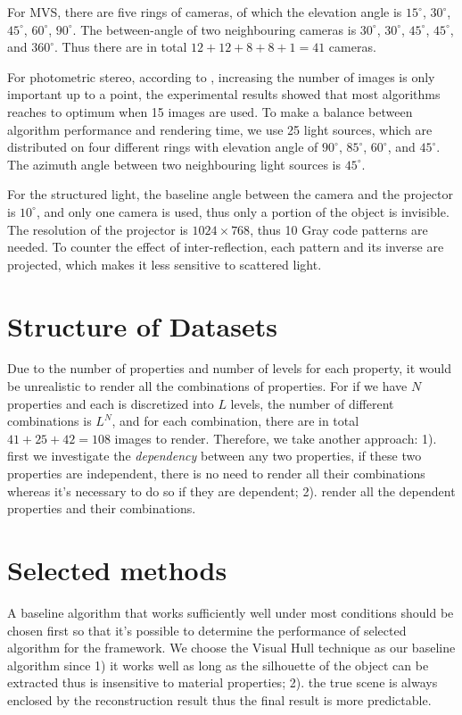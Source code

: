 For MVS, there are five rings of cameras, of which the elevation angle is $15^\circ$, $30^\circ$, $45^\circ$, $60^\circ$, $90^\circ$. The between-angle of two neighbouring cameras is $30^\circ$, $30^\circ$, $45^\circ$, $45^\circ$, and $360^\circ$. Thus there are in total $12+12+8+8+1=41$ cameras.

For photometric stereo, according to \cite{Berkiten:2016:ARB}, increasing the number of images is only important up to a point, the experimental results showed that most algorithms reaches to optimum when 15 images are used. To make a balance between algorithm performance and rendering time, we use 25 light sources, which are distributed on four different rings with elevation angle of $90^\circ$, $85^\circ$, $60^\circ$, and $45^\circ$. The azimuth angle between two neighbouring light sources is $45^\circ$.

For the structured light, the baseline angle between the camera and the projector is $10^\circ$, and only one camera is used, thus only a portion of the object is invisible. The resolution of the projector is $1024\times768$, thus 10 Gray code patterns are needed. To counter the effect of inter-reflection, each pattern and its inverse are projected, which makes it less sensitive to scattered light.

\section{Structure of Datasets}
Due to the number of properties and number of levels for each property, it would be unrealistic to render all the combinations of properties. For if we have $N$ properties and each is discretized into $L$ levels, the number of different combinations is $L^N$, and for each combination, there are in total $41+25+42=108$ images to render. Therefore, we take another approach: 1). first we investigate the \textit{dependency} between any two properties, if these two properties are independent, there is no need to render all their combinations whereas it's necessary to do so if they are dependent; 2). render all the dependent properties and their combinations.

\section{Selected methods}
A baseline algorithm that works sufficiently well under most conditions should be chosen first so that it's possible to determine the performance of selected algorithm for the framework. We choose the Visual Hull technique as our baseline algorithm since 1) it works well as long as the silhouette of the object can be extracted thus is insensitive to material properties; 2). the true scene is always enclosed by the reconstruction result thus the final result is more predictable.

